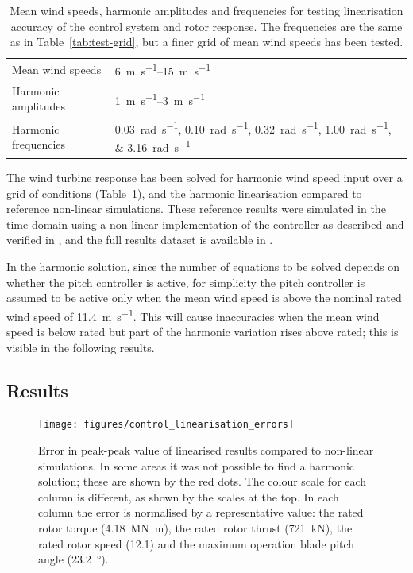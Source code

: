 \documentclass[preprint]{elsarticle}
\begin{document}
\begin{table}
  \centering
  \caption{Mean wind speeds, harmonic amplitudes and frequencies for testing
    linearisation accuracy of the control system and rotor response. The
    frequencies are the same as in Table~\ref{tab:test-grid}, but a finer grid
    of mean wind speeds has been tested.}
  \label{tab:test-grid-2}
  \begin{tabular}{ll}
    \toprule
    Mean wind speeds & \SIrange{6}{15}{\meter\per\second} \\
    Harmonic amplitudes & \SIrange{1}{3}{\meter\per\second} \\
    Harmonic frequencies & \SIlist{0.03;0.10;0.32;1.00;3.16}{\radian\per\second} \\
    \bottomrule
  \end{tabular}
\end{table}

The wind turbine response has been solved for harmonic wind speed input over a
grid of conditions (Table~\ref{tab:test-grid-2}), and the harmonic linearisation
compared to reference non-linear simulations. These reference results were
simulated in the time domain using a non-linear implementation of the controller
as described and verified in \citet{lupton_frequencydomain_2015}, and the full
results dataset is available in \cite{lupton_2018_1484513}.

In the harmonic solution, since the number of equations to be solved depends on
whether the pitch controller is active, for simplicity the pitch controller is
assumed to be active only when the mean wind speed is above the nominal rated
wind speed of \SI{11.4}{\metre\per\second}. This will cause inaccuracies when
the mean wind speed is below rated but part of the harmonic variation rises
above rated; this is visible in the following results.

\subsection{Results}
\label{sec:control-results}

\begin{figure}
  \centering
  \hspace*{-0.5cm}\texttt{[image: figures/control\_linearisation\_errors]}
  \caption{Error in peak-peak value of linearised results compared to
    non-linear simulations. In some areas it was not possible to find a
    harmonic solution; these are shown by the red dots. The colour
    scale for each column is different, as shown by the scales at the
    top. In each column the error is normalised by a representative
    value: the rated rotor torque (\SI{4.18}{\mega\newton\metre}), the
    rated rotor thrust (\SI{721}{\kilo\newton}), the rated rotor speed
    (\SI{12.1}{\rpm}) and the maximum operation blade pitch angle
    (\SI{23.2}{\degree}).}
  \label{fig:control-lin-errors}
\end{figure}
\end{document}
